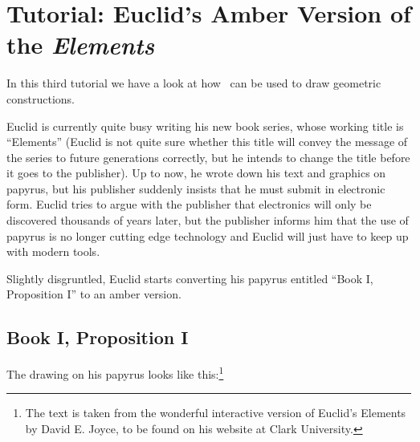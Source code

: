 %
%
%


\section{Tutorial: Euclid's Amber Version of the \emph{Elements}}

In this third tutorial we have a look at how \tikzname\ can be used to draw
geometric constructions.

Euclid is currently quite busy writing his new book series, whose working title
is ``Elements'' (Euclid is not quite sure whether this title will convey the
message of the series to future generations correctly, but he intends to change
the title before it goes to the publisher). Up to now, he wrote down his text
and graphics on papyrus, but his publisher suddenly insists that he must submit
in electronic form. Euclid tries to argue with the publisher that electronics
will only be discovered thousands of years later, but the publisher informs him
that the use of papyrus is no longer cutting edge technology and Euclid will
just have to keep up with modern tools.

Slightly disgruntled, Euclid starts converting his papyrus entitled ``Book I,
Proposition I'' to an amber version.


\subsection{Book I, Proposition I}

The drawing on his papyrus looks like this:\footnote{The text is taken from the
wonderful interactive version of Euclid's Elements by David E. Joyce, to be
found on his website at Clark University.}

